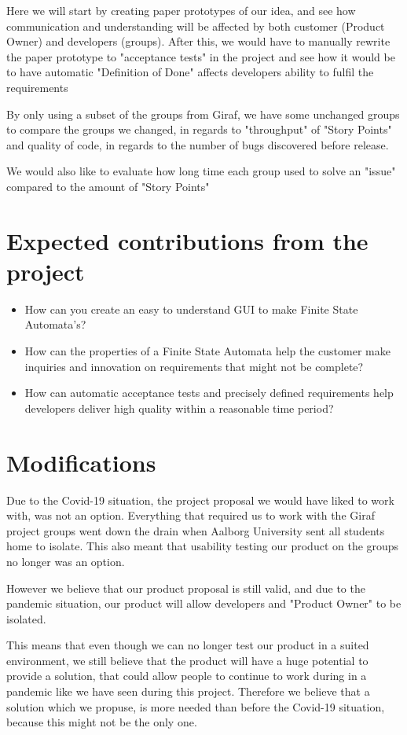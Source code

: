 Here we will start by creating paper prototypes of our idea, and see how communication and understanding will be affected by both customer (Product Owner) and developers (groups).
After this, we would have to manually rewrite the paper prototype to "acceptance tests" in the project and see how it would be to have automatic "Definition of Done" affects developers ability to fulfil the requirements

By only using a subset of the groups from Giraf, we have some unchanged groups to compare the groups we changed, in regards to "throughput" of "Story Points" and quality of code, in regards to the number of bugs discovered before release.

We would also like to evaluate how long time each group used to solve an "issue" compared to the amount of "Story Points" 


\section{Expected contributions from the project}
\begin{itemize}
    \item How can you create an easy to understand GUI to make Finite State Automata's?
    \item How can the properties of a Finite State Automata help the customer make inquiries and innovation on requirements that might not be complete?
    \item How can automatic acceptance tests and precisely defined requirements help developers deliver high quality within a reasonable time period?
\end{itemize}
\section{Modifications}
Due to the Covid-19 situation, the project proposal we would have liked to work with, was not an option.
Everything that required us to work with the Giraf project groups went down the drain when Aalborg University sent all students home to isolate.
This also meant that usability testing our product on the groups no longer was an option. 

However we believe that our product proposal is still valid, and due to the pandemic situation, our product will allow developers and "Product Owner" to be isolated.

This means that even though we can no longer test our product in a suited environment, we still believe that the product will have a huge potential to provide a solution, that could allow people to continue to work during in a pandemic like we have seen during this project.
Therefore we believe that a solution which we propuse, is more needed than before the Covid-19 situation, because this might not be the only one.
